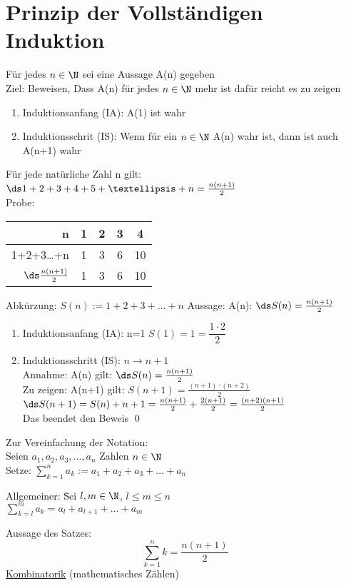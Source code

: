 \section{Prinzip der Vollständigen Induktion}
Für jedes $n \in \N$ sei eine Aussage A(n) gegeben\\
Ziel: Beweisen, Dass A(n) für jedes $n \in \N$ mehr ist dafür reicht es zu zeigen
\begin{enumerate}
\item{Induktionsanfang (IA): A(1) ist wahr}
\item{Induktionsschrit (IS): Wenn für ein $n \in \N$ A(n) wahr ist, dann ist auch A(n+1) wahr}
\end{enumerate}
%
Für jede natürliche Zahl n gilt: $\ds 1+2+3+4+5+…+n=\frac{n(n+1)}{2}$\\
Probe:\\
\begin{tabular}{r|c|c|c|c}
n & 1 & 2 & 3 & 4\\ \hline\hline
1+2+3…+n & 1 & 3 & 6 & 10\\ \hline
$\ds \frac{n(n+1)}{2}$ & 1 & 3 & 6 & 10\\
\end{tabular}
Abkürzung: $S(n) := 1+2+3+…+n$
Aussage: A(n): $\ds S(n) = \frac{n(n+1)}{2}$
\begin{enumerate}
\item {Induktionsanfang (IA): n=1 $S(1) = 1 = \dfrac{1·2}{2}$}
\item {Induktionsschritt (IS): $n → n+1$\\
Annahme: A(n) gilt: $\ds S(n) = \frac{n(n+1)}{2}$\\
Zu zeigen: A(n+1) gilt: $S(n+1)=\frac{(n+1)·(n+2)}{2}$\\
$\ds S(n+1)=S(n)+n+1=\frac{n(n+1)}{2}+\frac{2(n+1)}{2}=\frac{(n+2)(n+1)}{2}$\\
Das beendet den Beweis} \qed
\end{enumerate}
Zur Vereinfachung der Notation:\\
Seien $a_1,a_2,a_3,…,a_n$ Zahlen $n \in \N$\\
Setze: $\sum_{k=1}^n a_k := a_1+a_2+a_3+…+a_n$\\
\begin{tabbing}
Allgemeiner: \=Sei $l,m \in \N$, $l \le m \le n$\\
\>$\sum_{k=l}^m a_k = a_l+a_{l+1}+…+a_m$\\
\end{tabbing}
Aussage des Satzes:
\[ \sum_{k=1}^n k = \frac{n(n+1)}{2}\]
\hfill\underline{Kombinatorik} (mathematisches Zählen)

